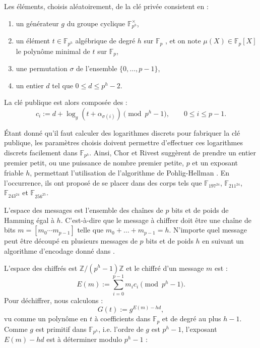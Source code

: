 \documentclass[a4paper, titlepage, 11pt]{article}
\theoremstyle{definition}
\theoremstyle{remark}
\def\Z{\mathbb Z}
\def\gf #1{\mathbb{F}_{#1}}
\begin{document}
Les éléments, choisis aléatoirement, de la clé privée consistent en :
\begin{enumerate}
\item un générateur $g$ du groupe cyclique $\gf{p^h}^\times$,
\item un élément $t \in \gf{p^h}$ algébrique de degré $h$ sur $\gf{p}$ , et on note $\mu(X) \in \gf{p}[X]$ le polynôme minimal de $t$ sur $\gf{p}$,
\item une permutation $\sigma$ de l'ensemble $\{0, \dots, p-1\}$,
\item un entier $d$ tel que $0 \leqslant d \leqslant p^h-2$.
\end{enumerate}
La clé publique est alors composée des :
$$c_i := d + \log_g\left(t + \alpha_{\sigma(i)}\right) \pmod{p^h-1}, \qquad 0 \leqslant i \leqslant p-1.$$

\'Etant donné qu'il faut calculer des logarithmes discrets pour fabriquer la clé publique, les paramètres choisis doivent permettre d'effectuer ces logarithmes discrets facilement dans $\gf{p^h}$. Ainsi, Chor et Rivest suggèrent de prendre un entier premier petit, ou une puissance de nombre premier petite, $p$ et un exposant friable $h$, permettant l'utilisation de l'algorithme de Pohlig-Hellman \cite{pohligHellman1978}. En l’occurrence, ils ont proposé de se placer dans des corps tels que $\gf{197^{24}}$, $\gf{211^{24}}$, $\gf{243^{24}}$ et $\gf{256^{25}}$.

L'espace des messages est l'ensemble des chaînes de $p$ bits et de poids de Hamming égal à $h$. C'est-à-dire que le message à chiffrer doit être une chaîne de bits $m = [m_0\cdots m_{p-1}]$ telle que $m_0+\dots + m_{p-1} = h$. N'importe quel message peut être découpé en plusieurs messages de $p$ bits et de poids $h$ en suivant un algorithme d'encodage donné dans \cite[IV.B.]{chorRivest1988}.

L'espace des chiffrés est $\Z/(p^h-1)\Z$ et le chiffré d'un message $m$ est :
$$E(m) := \sum_{i=0}^{p-1} m_ic_i \pmod{p^h-1}.$$
Pour déchiffrer, nous calculons :
$$G(t) := g^{E(m) - hd},$$
vu comme un polynôme en $t$ à coefficients dans $\gf{p}$ et de degré au plus $h-1$. Comme $g$ est primitif dans $\gf{p^h}$, i.e. l'ordre de $g$ est $p^h-1$, l'exposant $E(m) - hd$ est à déterminer modulo $p^h-1$ :
\end{document}
